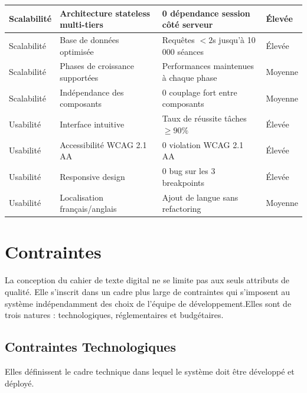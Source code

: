 \begin{table}[H]
\begin{tabularx}{\textwidth}{|l|X|X|l|}
Scalabilité
& Architecture stateless multi-tiers
& 0 dépendance session côté serveur & Élevée \\
\hline
Scalabilité
& Base de données optimisée
& Requêtes $< 2$s jusqu'à 10 000 séances & Élevée \\
\hline
Scalabilité
& Phases de croissance supportées
& Performances maintenues à chaque phase & Moyenne \\
\hline
Scalabilité
& Indépendance des composants
& 0 couplage fort entre composants & Moyenne \\
\hline

Usabilité
& Interface intuitive
& Taux de réussite tâches $\geq 90\%$ & Élevée \\
\hline
Usabilité
& Accessibilité WCAG 2.1 AA
& 0 violation WCAG 2.1 AA & Élevée \\
\hline
Usabilité
& Responsive design
& 0 bug sur les 3 breakpoints & Élevée \\
\hline
Usabilité
& Localisation français/anglais
& Ajout de langue sans refactoring & Moyenne \\
\hline

\end{tabularx}
\end{table}

\section{Contraintes}

La conception du cahier de texte digital ne se limite pas aux seuls attributs de qualité. Elle s'inscrit dans
un cadre plus large de contraintes qui s'imposent au système
indépendamment des choix de l'équipe de développement.Elles
sont de trois natures : technologiques, réglementaires et budgétaires.

\subsection{Contraintes Technologiques}


Elles définissent le cadre technique dans lequel
le système doit être développé et déployé.

